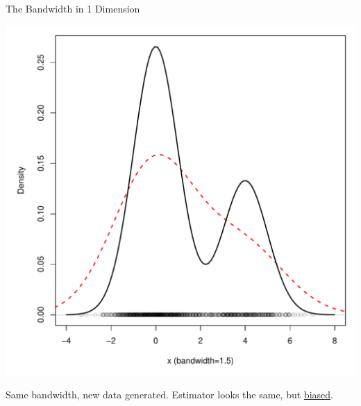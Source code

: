 \documentclass[12pt]{beamer}
\begin{document}
\begin{frame}{The Bandwidth in 1 Dimension}


  \begin{center}
    \includegraphics[scale=0.4]{figs/density3_2.pdf}
    \end{center}

\vspace{-.2in}

\begin{center}
  Same bandwidth, new data generated. Estimator looks the same, but \underline{biased}.
\end{center}

  
  
\end{frame}
\end{document}
